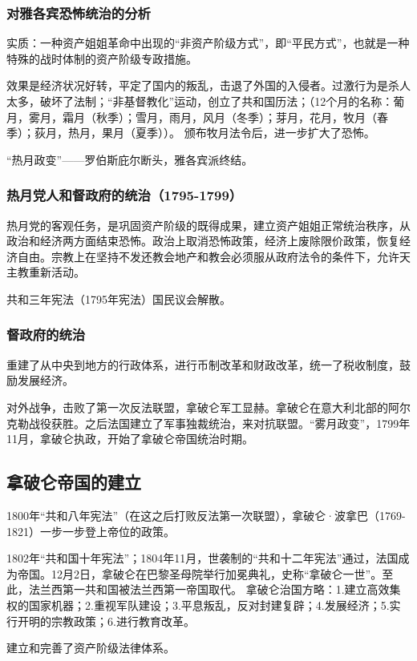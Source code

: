 \subsubsection{对雅各宾恐怖统治的分析}
实质：一种资产姐姐革命中出现的“非资产阶级方式”，即“平民方式”，也就是一种特殊的战时体制的资产阶级专政措施。

效果是经济状况好转，平定了国内的叛乱，击退了外国的入侵者。过激行为是杀人太多，破坏了法制；“非基督教化”运动，创立了共和国历法；（12个月的名称：葡月，雾月，霜月（秋季）；雪月，雨月，风月（冬季）；芽月，花月，牧月（春季）；荻月，热月，果月（夏季））。
颁布牧月法令后，进一步扩大了恐怖。

“热月政变”——罗伯斯庇尔断头，雅各宾派终结。

\subsubsection{热月党人和督政府的统治（1795-1799）}
热月党的客观任务，是巩固资产阶级的既得成果，建立资产姐姐正常统治秩序，从政治和经济两方面结束恐怖。政治上取消恐怖政策，经济上废除限价政策，恢复经济自由。宗教上在坚持不发还教会地产和教会必须服从政府法令的条件下，允许天主教重新活动。

共和三年宪法（1795年宪法）国民议会解散。

\subsubsection{督政府的统治}
重建了从中央到地方的行政体系，进行币制改革和财政改革，统一了税收制度，鼓励发展经济。

对外战争，击败了第一次反法联盟，拿破仑军工显赫。拿破仑在意大利北部的阿尔克勒战役获胜。之后法国建立了军事独裁统治，来对抗联盟。“雾月政变”，1799年11月，拿破仑执政，开始了拿破仑帝国统治时期。

\subsection{拿破仑帝国的建立}
1800年“共和八年宪法”（在这之后打败反法第一次联盟），拿破仑·波拿巴（1769-1821）一步一步登上帝位的政策。

1802年“共和国十年宪法”；1804年11月，世袭制的“共和十二年宪法”通过，法国成为帝国。12月2日，拿破仑在巴黎圣母院举行加冕典礼，史称“拿破仑一世”。至此，法兰西第一共和国被法兰西第一帝国取代。
拿破仑治国方略：1.建立高效集权的国家机器；2.重视军队建设；3.平息叛乱，反对封建复辟；4.发展经济；5.实行开明的宗教政策；6.进行教育改革。

建立和完善了资产阶级法律体系。

